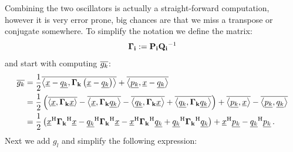 \documentclass[a4paper,10pt]{article}
\begin{document}
Combining the two oscillators is actually a straight-forward computation,
however it is very error prone, big chances are that we miss a transpose
or conjugate somewhere. To simplify the notation we define the matrix:
\begin{equation}
  \mathbf{\Gamma_i} := \mathbf{P_i}\mathbf{Q_i}{}^{-1}
\end{equation}
and start with computing $\overline{g_k}$:
\begin{equation*}
\begin{split}
 \overline{g_k}
 & =
 \frac{1}{2}\overline{\left\langle \underline{x}-\underline{q_k} , \mathbf{\Gamma_k} \left(\underline{x}-\underline{q_k}\right) \right\rangle}
 +\overline{\left\langle \underline{p_k} , \underline{x}-\underline{q_k} \right\rangle} \\
 & =
 \frac{1}{2} \left(
                \overline{\left\langle \underline{x} , \mathbf{\Gamma_k} \underline{x} \right\rangle}
               -\overline{\left\langle \underline{x} , \mathbf{\Gamma_k} \underline{q_k} \right\rangle}
               -\overline{\left\langle \underline{q_k} , \mathbf{\Gamma_k} \underline{x} \right\rangle}
               +\overline{\left\langle \underline{q_k} , \mathbf{\Gamma_k} \underline{q_k} \right\rangle}
              \right)
 + \overline{\left\langle \underline{p_k} , \underline{x} \right\rangle}
 - \overline{\left\langle \underline{p_k} , \underline{q_k} \right\rangle} \\
 & =
 \frac{1}{2} \left(
               \underline{x}{}^{\textnormal{H}} \mathbf{\Gamma_k}{}^{\textnormal{H}} \underline{x}
              -\underline{q_k}{}^{\textnormal{H}} \mathbf{\Gamma_k}{}^{\textnormal{H}} \underline{x}
              -\underline{x}{}^{\textnormal{H}} \mathbf{\Gamma_k}{}^{\textnormal{H}} \underline{q_k}
              +\underline{q_k}{}^{\textnormal{H}} \mathbf{\Gamma_k}{}^{\textnormal{H}} \underline{q_k}
              \right)
 + \underline{x}{}^{\textnormal{H}} \underline{p_k} - \underline{q_k}{}^{\textnormal{H}} \underline{p_k} \,.
\end{split}
\end{equation*}
Next we add $g_l$ and simplify the following expression:
\end{document}
